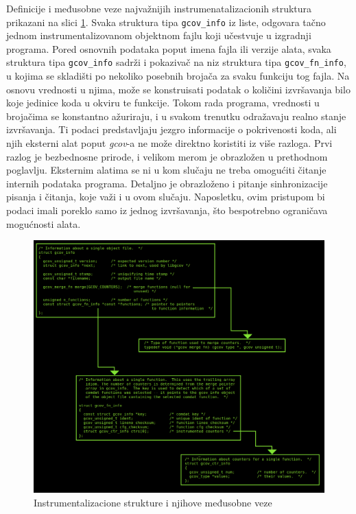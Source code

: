 \documentclass[12pt,oneside]{memoir}
\newcommand{\kod}[1]{\texttt{#1}}
\newcommand{\strano}[1]{\textit{#1}}
\begin{document}
Definicije i međusobne veze najvažnijih instrumenatalizacionih struktura prikazani na slici \ref{fig:instr}. 
Svaka struktura tipa \kod{gcov\_info} iz liste, odgovara tačno jednom instrumentalizovanom objektnom fajlu koji učestvuje u izgradnji programa. Pored osnovnih podataka poput imena fajla ili verzije alata, svaka struktura tipa \kod{gcov\_info} sadrži i pokazivač na niz struktura tipa \kod{gcov\_fn\_info}, u kojima se skladišti po nekoliko posebnih brojača za svaku funkciju tog fajla. Na osnovu vrednosti u njima, može se konstruisati podatak o količini izvršavanja bilo koje jedinice koda u okviru te funkcije. Tokom rada programa, vrednosti u brojačima se konstantno ažuriraju, i u svakom trenutku odražavaju realno stanje izvršavanja. Ti podaci predstavljaju jezgro informacije o pokrivenosti koda, ali njih eksterni alat poput \strano{gcov}-a ne može direktno koristiti iz više razloga. Prvi razlog je bezbednosne prirode, i velikom merom je obrazložen u prethodnom poglavlju. Eksternim alatima se ni u kom slučaju ne treba omogućiti čitanje internih podataka programa. Detaljno je obrazloženo i pitanje sinhronizacije pisanja i čitanja, koje važi i u ovom slučaju. Naposletku, ovim pristupom bi podaci imali poreklo samo iz jednog izvršavanja, što bespotrebno ograničava mogućnosti alata. 

\begin{figure}[!ht]
  \centering
  \includegraphics[width=\textwidth]{img/instr_strukture.png}
  \caption{Instrumentalizacione strukture i njihove međusobne veze}
  \label{fig:instr}
\end{figure}
\end{document}
